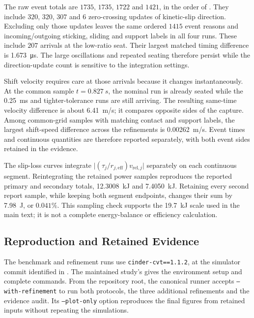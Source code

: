 \documentclass[11pt]{report}
\numberwithin{equation}{section}
\begin{document}
The raw event totals are \(1735\), \(1735\), \(1722\) and \(1421\), in the
order of . They include \(320\), \(320\),
\(307\) and \(6\) zero-crossing updates of kinetic-slip direction. Excluding
only those updates leaves the same ordered \(1415\) event reasons and
incoming/outgoing sticking, sliding and support labels in all four runs.
These include \(207\) arrivals at the low-ratio seat. Their largest matched
timing difference is \SI{1.673}{\micro\second}. The large oscillations and
repeated seating therefore persist while the direction-update count is
sensitive to the integration settings.

Shift velocity requires care at those arrivals because it changes
instantaneously. At the common sample \(t=\SI{0.827}{s}\), the nominal run is
already seated while the \SI{0.25}{ms} and tighter-tolerance runs are still
arriving. The resulting same-time velocity difference is about
\SI{6.41}{m/s}; it compares opposite sides of the capture. Among common-grid
samples with matching contact and support labels, the largest shift-speed
difference across the refinements is \SI{0.00262}{m/s}. Event times and
continuous quantities are therefore reported separately, with both event
sides retained in the evidence.

The slip-loss curves integrate
\(\lvert(\tau_j/r_{j,\mathrm{eff}})v_{\mathrm{rel},j}\rvert\) separately on
each continuous segment. Reintegrating the retained power samples reproduces
the reported primary and secondary totals, \SI{12.3008}{kJ} and
\SI{7.4050}{kJ}. Retaining every second report sample, while keeping both
segment endpoints, changes their sum by \SI{7.98}{J}, or \(0.041\%\).
This sampling check supports the \SI{19.7}{kJ} scale used in the main text;
it is not a complete energy-balance or efficiency calculation.

\subsection{Reproduction and Retained Evidence}
\label{app:ballew_reproduction}

The benchmark and refinement runs use \texttt{cinder-cvt==1.1.2}, at the
simulator commit identified in . The
maintained study's
gives the environment setup and complete commands. From the repository root,
the canonical runner
accepts \texttt{--with-refinement} to run both protocols, the three additional
refinements and the evidence audit. Its \texttt{--plot-only} option reproduces
the final figures from retained inputs without repeating the simulations.
\end{document}
